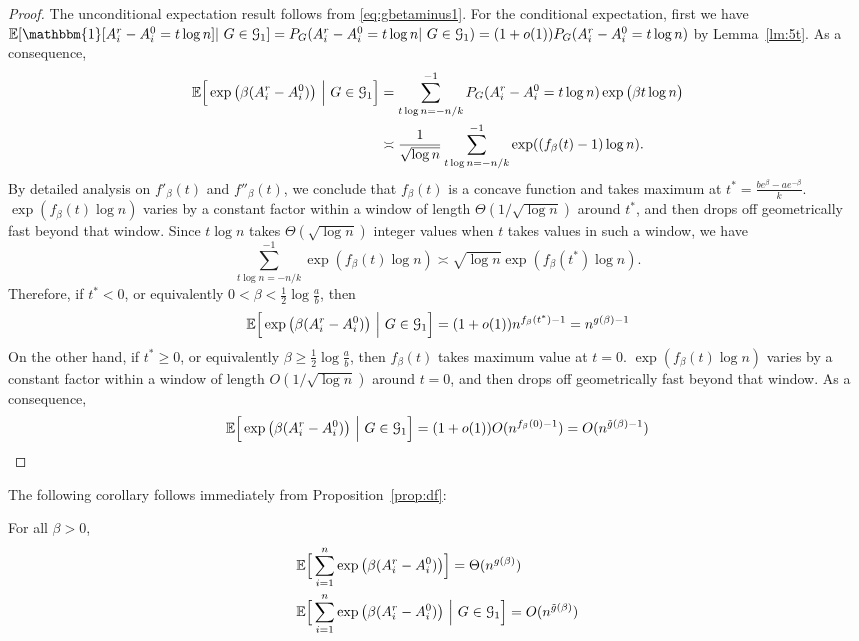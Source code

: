 \documentclass{article}
\begin{document}
\begin{proof}


The unconditional expectation result follows from \eqref{eq:gbetaminus1}.
For the conditional expectation, first we have
$\mathbb{E}[\mathbbm{1}[A^r_i - A^0_i = t \log n]|~G\in\cG_1] = P_G(A^r_i - A^0_i = t \log n|~G\in\cG_1) = (1+o(1))P_G(A^r_i - A^0_i = t \log n)$
by Lemma~\ref{lm:5t}.
As a consequence,
\begin{equation}  \label{eq:wf1}
\begin{aligned}
\mathbb{E} \Big[\exp\big(\beta (A^r_i-A^0_i) \big) ~\Big|~ G\in\mathcal{G}_1 \Big]
& =  \sum_{t\log n=-n/k}^{-1}
P_G(A^r_i - A^0_i = t \log n)\exp\big(\beta t \log n \big)  \\
& \asymp  \frac{1} {\sqrt{\log n}} \sum_{t\log n=-n/k}^{-1}
 \exp( (f_{\beta}(t) -1)\log n ) .
\end{aligned}
\end{equation}
By detailed analysis on $f'_{\beta}(t)$ and $f''_{\beta}(t)$,
we conclude that $f_{\beta}(t)$ is a concave function and takes maximum at
$t^\ast=\frac{b e^{\beta}-a e^{-\beta}}{k}$.
$\exp( f_{\beta}(t) \log n)$ varies by a constant factor within a window of length $\Theta(1/\sqrt{\log n})$ around $t^\ast$, and
then drops off geometrically fast beyond that window. Since $t\log n$ takes $\Theta(\sqrt{\log n})$ integer values when $t$ takes values in such a window, we have
\begin{equation} \label{eq:wf2}
\sum_{t\log n=-n/k}^{-1}
 \exp( f_{\beta}(t) \log n )
 \asymp \sqrt{\log n}
 \exp( f_{\beta}(t^\ast) \log n ) .
\end{equation}
Therefore, if $t^\ast<0$,
or equivalently $0<\beta<\frac{1}{2}\log\frac{a}{b}$, then
$$
\mathbb{E} \Big[\exp\big(\beta (A^r_i-A^0_i) \big) ~\Big|~ G\in\mathcal{G}_1 \Big] = (1+o(1))
n^{f_{\beta}(t^*)-1} = n^{g(\beta)-1}
$$
On the other hand,
if $t^\ast\ge 0$, or equivalently $\beta\ge\frac{1}{2}\log\frac{a}{b}$, then
$f_{\beta}(t)$ takes maximum value at $t=0$.
$\exp( f_{\beta}(t) \log n)$ varies by a constant factor within a window of length $O(1/\sqrt{\log n})$ around $t=0$, and
then drops off geometrically fast beyond that window. As a consequence,
\begin{align*}
\mathbb{E} \Big[\exp\big(\beta (A^r_i-A^0_i) \big) ~\Big|~ G\in\mathcal{G}_1 \Big] = (1+o(1))
O(n^{f_{\beta}(0)-1}) = O(n^{\tilde{g}(\beta)-1})
\end{align*}
\end{proof}
The following corollary follows immediately from Proposition~\ref{prop:df}:
\begin{corollary} \label{cr:yy}
For all $\beta>0$,
\begin{align}
& \mathbb{E} \Big[ \sum_{i=1}^n  \exp\big(\beta (A^r_i-A^0_i) \big)  \Big] 
= \Theta(n^{g(\beta)}) \label{eq:ThetaEbeta} \\
& \mathbb{E} \Big[ \sum_{i=1}^n  \exp\big(\beta (A^r_i-A^0_i) \big) ~\Big|~ G\in\mathcal{G}_1 \Big] 
= O(n^{\tilde{g}(\beta)})
\end{align}
\end{corollary}
\end{document}
